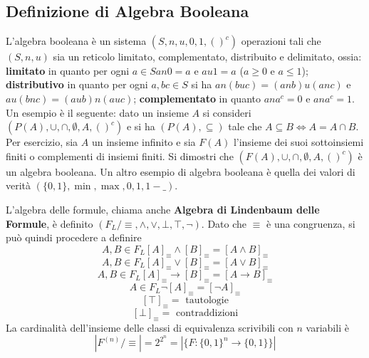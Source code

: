 \subsection{Definizione di Algebra Booleana}
L'algebra booleana è un sistema $(S, n, u, 0, 1, ()^c)$ operazioni 
tali che $(S,n,u)$ sia un reticolo limitato, complementato, 
distribuito e delimitato, ossia: 
\textbf{limitato} in quanto per ogni $a \in S a n 0 = a$ e $a u 1 = a$ ($ a \geq 0$ e $ a \leq 1$); 
\textbf{distributivo} in quanto per ogni $a,b c \in S$ si 
ha $a n (b u c) = (a n b) u (a n c)$ e $a u (b n c) = (a u b) n ( a u c)$; 
\textbf{complementato} in quanto 
$a n a^c = 0$ e $a n a^c = 1$. 
Un esempio è il seguente: dato un insieme $A$ si consideri 
$(P(A), \cup, \cap, \emptyset, A, ()^c)$ e si ha 
$(P(A), \subseteq)$ tale che $A \subseteq B \iff A = A \cap B$. 
Per esercizio, sia $A$ un insieme infinito e sia $F(A)$
l'insieme dei suoi sottoinsiemi finiti o complementi di insiemi 
finiti. Si dimostri che $(F(A), \cup, \cap, \emptyset, A, ()^c)$ è un algebra booleana. Un altro esempio di algebra 
booleana è quella dei valori di verità $(\{0,1\}, \min, \max, 0, 1, 1-\_)$. 

L'algebra delle formule, chiama anche \textbf{Algebra di 
Lindenbaum delle Formule}, è definito $(F_L/\equiv, \land, \lor, \bot, \top, \neg)$. 
Dato che $\equiv$ è una congruenza, si può quindi procedere a definire
$$
A,B \in F_L [A]_{\equiv} \land [B]_{\equiv} = [A \land B]_{\equiv}
$$
$$
A,B \in F_L [A]_{\equiv} \lor [B]_{\equiv} = [A \lor B]_{\equiv}
$$
$$
A,B \in F_L [A]_{\equiv} \rightarrow [B]_{\equiv} = [A \rightarrow B]_{\equiv}
$$
$$
A \in F_L \neg [A]_{\equiv} = [\neg A]_{\equiv}
$$
$$
[\top]_{\equiv} = \text{ tautologie}
$$
$$
[\bot]_{\equiv} = \text{ contraddizioni}
$$
La cardinalità dell'insieme delle classi di equivalenza scrivibili con $n$
variabili è 
$$
|F^{(n)}/\equiv| = 2 ^ {2^n} = |\{F: \{0,1\}^n \rightarrow \{0,1\}\}|
$$

